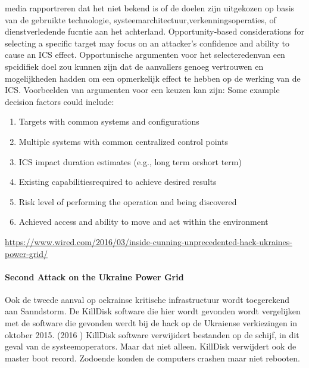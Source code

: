 		media rapportreren dat het niet bekend is of de doelen zijn uitgekozen op basis van de gebruikte
		technologie, systeemarchitectuur,verkenningsoperaties, of dienstverledende fucntie aan het
		achterland.
		Opportunity‐based considerations for selecting a specific target may focus on an attacker’s
		confidence and ability to cause an ICS effect. Opportunische argumenten voor het selecteredenvan
		een spcidifiek doel zou kunnen zijn dat de aanvallers genoeg vertrouwen en mogelijkheden hadden
		om een opmerkelijk effect te hebben op de werking van de ICS.
		Voorbeelden van argumenten voor een keuzen kan zijn:
		Some example decision factors could include:
		
		\begin{enumerate}
			\item Targets with common systems and configurations
			\item  Multiple systems with common centralized control points
			\item ICS impact duration estimates (e.g., long term orshort term)
			\item Existing capabilitiesrequired to achieve desired results
			\item Risk level of performing the operation and being discovered
			\item Achieved access and ability to move and act within the environment
		\end{enumerate}
		
		
		\url{https://www.wired.com/2016/03/inside-cunning-unprecedented-hack-ukraines-power-grid/}
		
		\paragraph{Second Attack on the Ukraine Power Grid}
		
		
		Ook de tweede aanval op oekrainse kritische infrastructuur wordt toegerekend aan Sanndstorm. De
		KillDisk software die hier wordt gevonden wordt vergelijken met de software die gevonden werdt bij
		de hack op de Ukraiense verkiezingen in oktober 2015. (2016 ) KillDisk software verwijidert
		bestanden op de schijf, in dit geval van de systeemoperators. Maar dat niet alleen. KillDisk verwijdert
		ook de master boot record. Zodoende konden de computers crashen maar niet rebooten.
		
